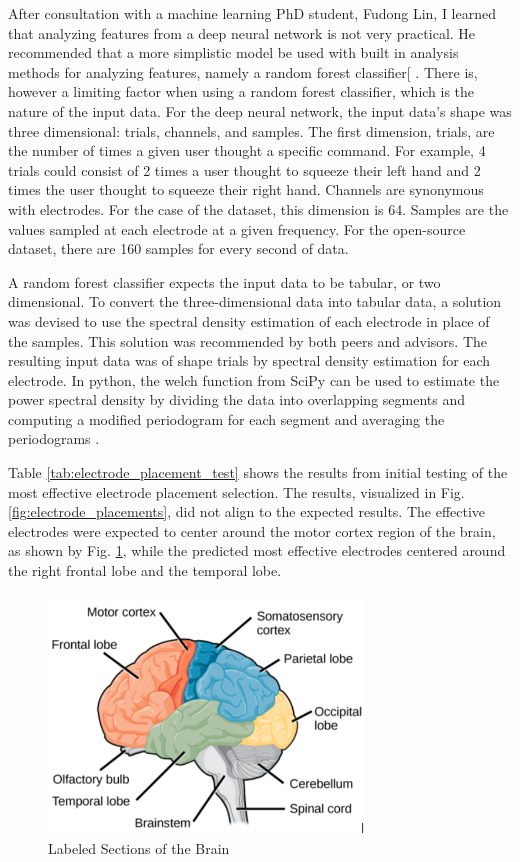 \documentclass[conference]{IEEEtran}
\begin{document}
    After consultation with a machine learning PhD student, Fudong Lin, I learned that analyzing features from a deep neural network is not very practical. He recommended that a more simplistic model be used with built in analysis methods for analyzing features, namely a random forest classifier[ \cite{scikit_feature_importances}. There is, however a limiting factor when using a random forest classifier, which is the nature of the input data. For the deep neural network, the input data’s shape was three dimensional: trials, channels, and samples. The first dimension, trials, are the number of times a given user thought a specific command. For example, 4 trials could consist of 2 times a user thought to squeeze their left hand and 2 times the user thought to squeeze their right hand. Channels are synonymous with electrodes. For the case of the dataset, this dimension is 64. Samples are the values sampled at each electrode at a given frequency. For the open-source dataset, there are 160 samples for every second of data.  

    A random forest classifier expects the input data to be tabular, or two dimensional. To convert the three-dimensional data into tabular data, a solution was devised to use the spectral density estimation of each electrode in place of the samples. This solution was recommended by both peers and advisors. The resulting input data was of shape trials by spectral density estimation for each electrode. In python, the welch function from SciPy can be used to estimate the power spectral density by dividing the data into overlapping segments and computing a modified periodogram for each segment and averaging the periodograms \cite{welch}.

    Table \ref{tab:electrode_placement_test} shows the results from initial testing of the most effective electrode placement selection. The results, visualized in Fig. \ref{fig:electrode_placements}, did not align to the expected results. The effective electrodes were expected to center around the motor cortex region of the brain, as shown by Fig. \ref{fig:brain}, while the predicted most effective electrodes centered around the right frontal lobe and the temporal lobe.
    \begin{figure}[htbp]
            \centerline{\includegraphics[height=2.5in, keepaspectratio]{figs/F/brain.png}}
            \caption{Labeled Sections of the Brain}
            \label{fig:brain}
    \end{figure} 
\end{document}
